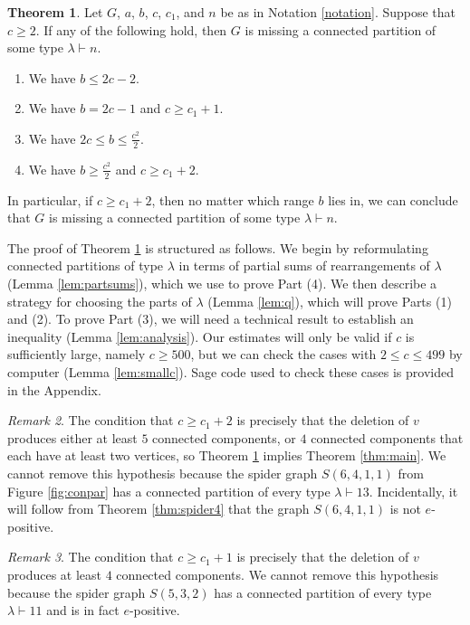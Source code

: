 \documentclass[12pt]{amsart}  %
\theoremstyle{definition}
\newtheorem{theorem}{Theorem}[section]
\theoremstyle{remark}
\newtheorem{remark}[theorem]{Remark}
\numberwithin{equation}{section}
\begin{document}
\begin{theorem}\label{thm:main2}
Let $G$, $a$, $b$, $c$, $c_1$, and $n$ be as in Notation \ref{notation}. Suppose that $c\geq 2$. If any of the following hold, then $G$ is missing a connected partition of some type $\lambda\vdash n$.
\begin{enumerate}
\item We have $b\leq 2c-2$.
\item We have $b=2c-1$ and $c\geq c_1+1$.
\item We have $2c\leq b\leq\frac{c^2}2$.
\item We have $b\geq\frac{c^2}2$ and $c\geq c_1+2$.
\end{enumerate}
In particular, if $c\geq c_1+2$, then no matter which range $b$ lies in, we can conclude that $G$ is missing a connected partition of some type $\lambda\vdash n$.
\end{theorem}

The proof of Theorem \ref{thm:main2} is structured as follows. We begin by reformulating connected partitions of type $\lambda$ in terms of partial sums of rearrangements of $\lambda$ (Lemma \ref{lem:partsums}), which we use to prove Part (4). We then describe a strategy for choosing the parts of $\lambda$ (Lemma \ref{lem:q}), which will prove Parts (1) and (2). To prove Part (3), we will need a technical result to establish an inequality (Lemma \ref{lem:analysis}). Our estimates will only be valid if $c$ is sufficiently large, namely $c\geq 500$, but we can check the cases with $2\leq c\leq 499$ by computer (Lemma \ref{lem:smallc}). Sage code used to check these cases is provided in the Appendix. 

\begin{remark} The condition that $c\geq c_1+2$ is precisely that the deletion of $v$ produces either at least $5$ connected components, or $4$ connected components that each have at least two vertices, so Theorem \ref{thm:main2} implies Theorem \ref{thm:main}. We cannot remove this hypothesis because the spider graph $S(6,4,1,1)$ from Figure \ref{fig:conpar} has a connected partition of every type $\lambda\vdash 13$. Incidentally, it will follow from Theorem \ref{thm:spider4} that the graph $S(6,4,1,1)$ is not $e$-positive. \end{remark}

\begin{remark} The condition that $c\geq c_1+1$ is precisely that the deletion of $v$ produces at least $4$ connected components. We cannot remove this hypothesis because the spider graph $S(5,3,2)$ has a connected partition of every type $\lambda\vdash 11$ and is in fact $e$-positive.\end{remark}
\end{document}
